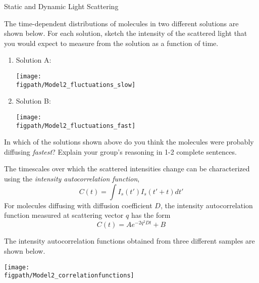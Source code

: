 \begin{activity}{Static and Dynamic Light Scattering}
\begin{ctqs}
	\question The time-dependent distributions of molecules in two different solutions are shown below.  For each solution, sketch the intensity of the scattered light that you would expect to measure from the solution as a function of time.
	
		\begin{enumerate}
			\item Solution A:
			
			\vspace{6pt}
			\centerline{\texttt{[image: \\figpath/Model2\_fluctuations\_slow]}}
			\vspace{6pt}
			
			\item Solution B:
			
			\vspace{6pt}
			\centerline{\texttt{[image: \\figpath/Model2\_fluctuations\_fast]}}
		\end{enumerate}
		
	\question In which of the solutions shown above do you think the molecules were probably diffusing \emph{fastest}?  Explain your group's reasoning in 1-2 complete sentences.
	
		\begin{solution}[1.5in]
		\end{solution}
	
\end{ctqs}

\clearpage
\begin{infobox}
	The timescales over which the scattered intensities change can be characterized using the \textit{intensity autocorrelation function},
	\begin{equation*}
		C(t) = \int I_s(t') I_s(t'+t)dt'
	\end{equation*}
	For molecules diffusing with diffusion coefficient $D$, the intensity autocorrelation function measured at scattering vector $q$ has the form
	\begin{equation*}
		C(t) = A e^{-2 q^2 D t} + B
	\end{equation*}
\end{infobox}

\begin{ctqs}
	\question The intensity autocorrelation functions obtained from three different samples are shown below.
	
			\vspace{6pt}
			\centerline{\texttt{[image: \\figpath/Model2\_correlationfunctions]}}	
	

\end{ctqs}
\end{activity}
